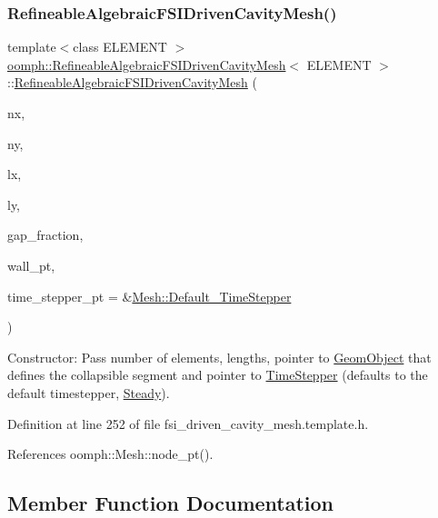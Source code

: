 \subsubsection{\texorpdfstring{Refineable\+Algebraic\+F\+S\+I\+Driven\+Cavity\+Mesh()}{RefineableAlgebraicFSIDrivenCavityMesh()}}
{\footnotesize\ttfamily template$<$class E\+L\+E\+M\+E\+NT $>$ \\
\hyperlink{classoomph_1_1RefineableAlgebraicFSIDrivenCavityMesh}{oomph\+::\+Refineable\+Algebraic\+F\+S\+I\+Driven\+Cavity\+Mesh}$<$ E\+L\+E\+M\+E\+NT $>$\+::\hyperlink{classoomph_1_1RefineableAlgebraicFSIDrivenCavityMesh}{Refineable\+Algebraic\+F\+S\+I\+Driven\+Cavity\+Mesh} (\begin{DoxyParamCaption}\item[{const unsigned \&}]{nx,  }\item[{const unsigned \&}]{ny,  }\item[{const double \&}]{lx,  }\item[{const double \&}]{ly,  }\item[{const double \&}]{gap\+\_\+fraction,  }\item[{\hyperlink{classoomph_1_1GeomObject}{Geom\+Object} $\ast$}]{wall\+\_\+pt,  }\item[{\hyperlink{classoomph_1_1TimeStepper}{Time\+Stepper} $\ast$}]{time\+\_\+stepper\+\_\+pt = {\ttfamily \&\hyperlink{classoomph_1_1Mesh_a12243d0fee2b1fcee729ee5a4777ea10}{Mesh\+::\+Default\+\_\+\+Time\+Stepper}} }\end{DoxyParamCaption})\hspace{0.3cm}{\ttfamily [inline]}}



Constructor\+: Pass number of elements, lengths, pointer to \hyperlink{classoomph_1_1GeomObject}{Geom\+Object} that defines the collapsible segment and pointer to \hyperlink{classoomph_1_1TimeStepper}{Time\+Stepper} (defaults to the default timestepper, \hyperlink{classoomph_1_1Steady}{Steady}). 



Definition at line 252 of file fsi\+\_\+driven\+\_\+cavity\+\_\+mesh.\+template.\+h.



References oomph\+::\+Mesh\+::node\+\_\+pt().



\subsection{Member Function Documentation}
\mbox{\label{classoomph_1_1RefineableAlgebraicFSIDrivenCavityMesh_aa68685323573763e1ded0cceed5ad14f}} 
